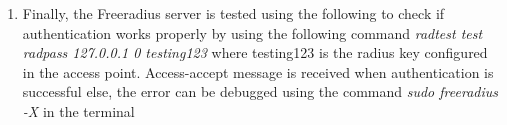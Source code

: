 \begin{enumerate}
	\item Finally, the Freeradius server is tested using the following to check if authentication works properly by using the following command \textit{radtest test radpass 127.0.0.1 0 testing123} where testing123 is the radius key configured in the access point. Access-accept message is received when authentication is successful else, the error can be debugged using the command \textit{sudo freeradius -X} in the terminal
	
\end{enumerate}
